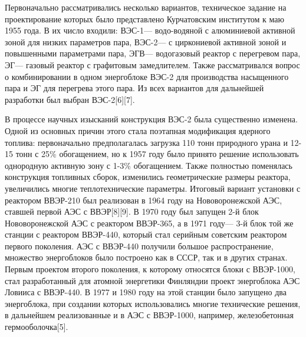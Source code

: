\documentclass[14pt]{article}
\begin{document}
Первоначально рассматривались несколько вариантов, техническое задание на проектирование которых было представлено Курчатовским институтом к маю 1955 года. В их число входили: ВЭС-1— водо-водяной с алюминиевой активной зоной для низких параметров пара, ВЭС-2— с циркониевой активной зоной и повышенными параметрами пара, ЭГВ— водогазовый реактор с перегревом пара, ЭГ— газовый реактор с графитовым замедлителем. Также рассматривался вопрос о комбинировании в одном энергоблоке ВЭС-2 для производства насыщенного пара и ЭГ для перегрева этого пара. Из всех вариантов для дальнейшей разработки был выбран ВЭС-2[6][7]. 

В процессе научных изысканий конструкция ВЭС-2 была существенно изменена. Одной из основных причин этого стала поэтапная модификация ядерного топлива: первоначально предполагалась загрузка 110 тонн природного урана и 12-15 тонн с 25\% обогащением, но к 1957 году было принято решение использовать однородную активную зону с 1-3\% обогащением. Также полностью поменялась конструкция топливных сборок, изменились геометрические размеры реактора, увеличились многие теплотехнические параметры. Итоговый вариант установки с реактором ВВЭР-210 был реализован в 1964 году на Нововоронежской АЭС, ставшей первой АЭС с ВВЭР[8][9]. 
В 1970 году был запущен 2-й блок Нововоронежской АЭС с реактором ВВЭР-365, а в 1971 году— 3-й блок той же станции с реактором ВВЭР-440, который стал серийным советским реактором первого поколения. АЭС с ВВЭР-440 получили большое распространение, множество энергоблоков было построено как в СССР, так и в других странах. Первым проектом второго поколения, к которому относятся блоки с ВВЭР-1000, стал разработанный для атомной энергетики Финляндии проект энергоблока АЭС Ловииса с ВВЭР-440. В 1977 и 1980 году на этой станции было запущено два энергоблока, при создании которых использовались многие технические решения, в дальнейшем реализованные и в АЭС с ВВЭР-1000, например, железобетонная гермооболочка[5]. 
\end{document}
